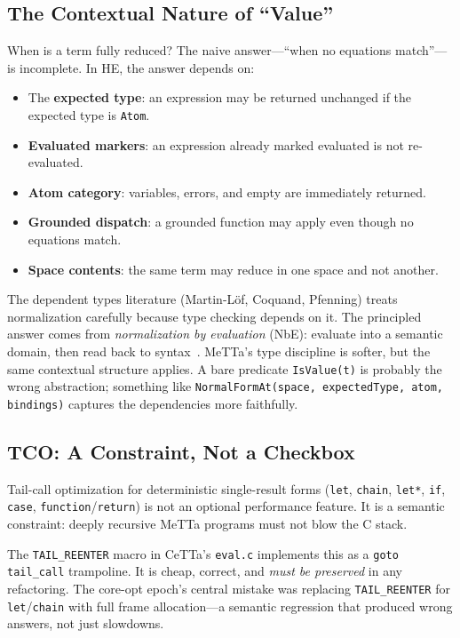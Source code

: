 \documentclass[11pt]{article}
\newcommand{\code}[1]{\texttt{#1}}
\newcommand{\HE}{\textup{HE}}
\newcommand{\CeTTa}{\textup{CeTTa}}
\begin{document}
\subsection{The Contextual Nature of ``Value''}

When is a term fully reduced?  The naive answer---``when no equations
match''---is incomplete.  In \HE{}, the answer depends on:

\begin{itemize}
\item The \textbf{expected type}: an expression may be returned unchanged
  if the expected type is \code{Atom}.
\item \textbf{Evaluated markers}: an expression already marked evaluated
  is not re-evaluated.
\item \textbf{Atom category}: variables, errors, and empty are immediately
  returned.
\item \textbf{Grounded dispatch}: a grounded function may apply even
  though no equations match.
\item \textbf{Space contents}: the same term may reduce in one space and
  not another.
\end{itemize}

The dependent types literature (Martin-Löf, Coquand, Pfenning) treats
normalization carefully because type checking depends on it.  The principled
answer comes from \emph{normalization by evaluation} (NbE): evaluate into a
semantic domain, then read back to syntax~\cite{BergerSchwichtenberg1991}.
MeTTa's type discipline is softer, but the same contextual structure applies.
A bare predicate \code{IsValue(t)} is probably the wrong abstraction;
something like \code{NormalFormAt(space, expectedType, atom, bindings)}
captures the dependencies more faithfully.

\subsection{TCO: A Constraint, Not a Checkbox}

Tail-call optimization for deterministic single-result forms (\code{let},
\code{chain}, \code{let*}, \code{if}, \code{case}, \code{function}/\code{return})
is not an optional performance feature.  It is a semantic constraint:
deeply recursive MeTTa programs must not blow the C stack.

The \code{TAIL\_REENTER} macro in \CeTTa{}'s \code{eval.c} implements
this as a \code{goto tail\_call} trampoline.  It is cheap, correct, and
\emph{must be preserved} in any refactoring.  The core-opt epoch's
central mistake was replacing \code{TAIL\_REENTER} for \code{let}/\code{chain}
with full frame allocation---a semantic regression that produced wrong
answers, not just slowdowns.
\end{document}

